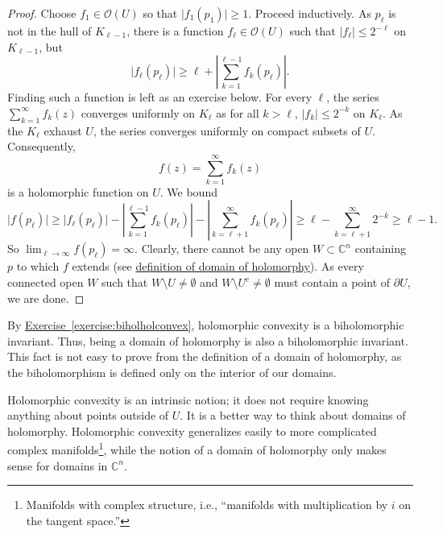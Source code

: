 \documentclass[12pt,openany]{book}
\newcommand{\sabs}[1]{\lvert {#1} \rvert}
\newcommand{\abs}[1]{\left\lvert {#1} \right\rvert}
\newcommand{\C}{{\mathbb{C}}}
\newcommand{\sO}{{\mathscr{O}}}
\theoremstyle{plain}
\theoremstyle{remark}
\theoremstyle{definition}
\theoremstyle{exercise}
\theoremstyle{example}
\newcommand{\exerciseref}[1]{\hyperref[#1]{Exercise~\ref*{#1}}}
\begin{document}
\begin{proof}
Choose $f_1 \in \sO(U)$ so that $\sabs{f_1(p_1)} \geq 1$.
Proceed inductively.
As $p_\ell$ is not in the hull of $K_{\ell-1}$, there is a function $f_\ell \in
\sO(U)$ such that $\sabs{f_\ell} \leq 2^{-\ell}$ on $K_{\ell-1}$, but
\begin{equation*}
\sabs{f_\ell(p_\ell)} \geq \ell + \abs{\sum_{k=1}^{\ell-1} f_k(p_\ell)} .
\end{equation*}
Finding such a function is left as an exercise below.
For every $\ell$, the series $\sum_{k=1}^\infty f_k(z)$ converges uniformly on
$K_\ell$
as for all $k > \ell$, $\sabs{f_k} \leq 2^{-k}$ on $K_\ell$.
As the $K_\ell$ exhaust $U$, the series converges uniformly on compact
subsets of $U$.  Consequently,
\begin{equation*}
f(z) = \sum_{k=1}^\infty f_k(z)
\end{equation*}
is a holomorphic function on $U$.  We bound
\begin{equation*}
\sabs{f(p_\ell)} \geq
\sabs{f_\ell(p_\ell)}
-
\abs{\sum_{k=1}^{\ell-1} f_k(p_\ell)}
-
\abs{\sum_{k=\ell+1}^\infty f_k(p_\ell)}
\geq
\ell
-
\sum_{k=\ell+1}^\infty 2^{-k}
\geq \ell-1 .
\end{equation*}
So $\lim_{\ell\to\infty} f(p_\ell) = \infty$.
Clearly, there cannot be any open $W \subset \C^n$
containing $p$ to which $f$ extends (see
\hyperref[defn:domainofhol]{definition of domain of holomorphy}).  As every
connected open $W$ such that
$W \setminus U \neq \emptyset$
and
$W \setminus U^c \neq \emptyset$
must contain a
point of $\partial U$, we are done.
\end{proof}

By \exerciseref{exercise:biholholconvex},
holomorphic convexity is a biholomorphic invariant.
Thus,
being a domain of holomorphy is also a biholomorphic invariant.  This
fact is not easy to prove from the definition of a domain of
holomorphy, as the
biholomorphism is defined only on the interior of our domains.

Holomorphic convexity is an intrinsic notion; it does not require
knowing anything about points outside of $U$.  It is a
better way to think about domains of holomorphy.  Holomorphic
convexity generalizes easily to more complicated complex
manifolds\footnote{Manifolds with complex structure, i.e., ``manifolds
with multiplication by $i$ on the tangent space.''}, while
the notion of a domain of holomorphy only makes sense for domains in $\C^n$.
\end{document}
